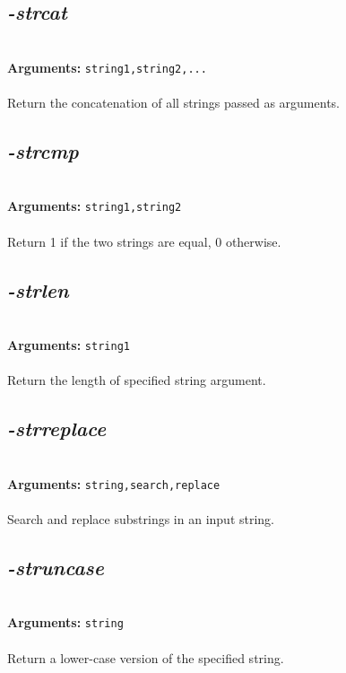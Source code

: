 \documentclass[a4paper,11pt,twoside]{book}
\begin{document}
\subsection{\emph{-strcat} }\vspace*{-0.5em}
~\\\textbf{Arguments: } 
{\small \texttt{string1,string2,...}}\\~\\
Return the concatenation of all strings passed as arguments.


\subsection{\emph{-strcmp} }\vspace*{-0.5em}
~\\\textbf{Arguments: } 
{\small \texttt{string1,string2}}\\~\\
Return 1 if the two strings are equal, 0 otherwise.


\subsection{\emph{-strlen} }\vspace*{-0.5em}
~\\\textbf{Arguments: } 
{\small \texttt{string1}}\\~\\
Return the length of specified string argument.


\subsection{\emph{-strreplace} }\vspace*{-0.5em}
~\\\textbf{Arguments: } 
{\small \texttt{string,search,replace}}\\~\\
Search and replace substrings in an input string.


\subsection{\emph{-struncase} }\vspace*{-0.5em}
~\\\textbf{Arguments: } 
{\small \texttt{string}}\\~\\
Return a lower-case version of the specified string.
\end{document}

